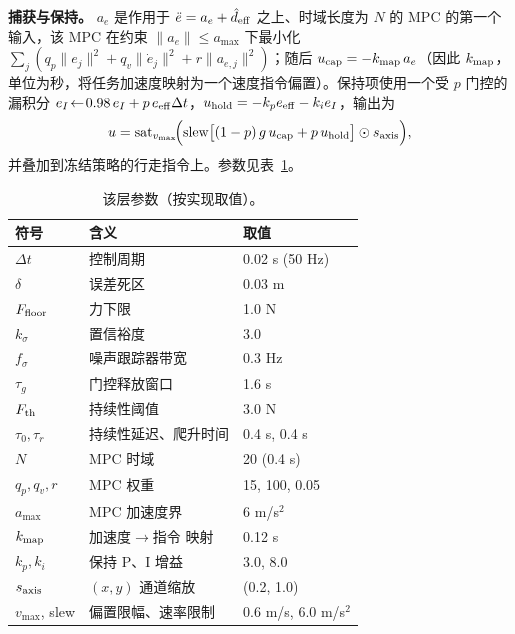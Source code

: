 \documentclass[journal]{IEEEtran}
\begin{document}
\textbf{捕获与保持。} $a_e$ 是作用于 $\ddot e=a_e+\hat d_{\rm eff}$ 之上、时域长度为 $N$ 的 MPC 的第一个输入，该 MPC 在约束 $\|a_e\|\le a_{\max}$ 下最小化 $\sum_j(q_p\|e_j\|^2+q_v\|\dot e_j\|^2+r\|a_{e,j}\|^2)$；随后 $u_{\rm cap}=-k_{\rm map}\,a_e$（因此 $k_{\rm map}$，单位为秒，将任务加速度映射为一个速度指令偏置）。保持项使用一个受 $p$ 门控的漏积分 $e_I\!\leftarrow\!0.98\,e_I+p\,e_{\rm eff}\Delta t$，$u_{\rm hold}=-k_p e_{\rm eff}-k_i e_I$，输出为
\begin{equation}
u=\mathrm{sat}_{v_{\max}}\!\Big(\mathrm{slew}\big[(1-p)\,g\,u_{\rm cap}+p\,u_{\rm hold}\big]\odot s_{\rm axis}\Big),
\label{eq:out}
\end{equation}
并叠加到冻结策略的行走指令上。参数见表~\ref{tab:params}。

\begin{table}[t]
\caption{该层参数（按实现取值）。}
\label{tab:params}
\centering
\small
\setlength{\tabcolsep}{4pt}
\begin{tabular}{lll}
\hline
符号 & 含义 & 取值\\
\hline
$\Delta t$ & 控制周期 & 0.02 s (50 Hz)\\
$\delta$ & 误差死区 & 0.03 m\\
$F_{\rm floor}$ & 力下限 & 1.0 N\\
$k_\sigma$ & 置信裕度 & 3.0\\
$f_\sigma$ & 噪声跟踪器带宽 & 0.3 Hz\\
$\tau_g$ & 门控释放窗口 & 1.6 s\\
$F_{\rm th}$ & 持续性阈值 & 3.0 N\\
$\tau_0,\tau_r$ & 持续性延迟、爬升时间 & 0.4 s, 0.4 s\\
$N$ & MPC 时域 & 20 (0.4 s)\\
$q_p,q_v,r$ & MPC 权重 & 15, 100, 0.05\\
$a_{\max}$ & MPC 加速度界 & 6 m/s$^2$\\
$k_{\rm map}$ & 加速度$\rightarrow$指令 映射 & 0.12 s\\
$k_p,k_i$ & 保持 P、I 增益 & 3.0, 8.0\\
$s_{\rm axis}$ & $(x,y)$ 通道缩放 & (0.2, 1.0)\\
$v_{\max}$, slew & 偏置限幅、速率限制 & 0.6 m/s, 6.0 m/s$^2$\\
\hline
\end{tabular}
\end{table}
\end{document}
